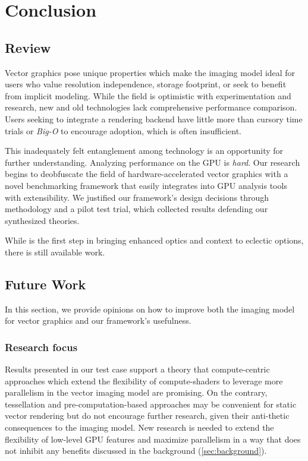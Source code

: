 \section{Conclusion}

\subsection{Review}\label{sec:conclusion}
Vector graphics pose unique properties which make the imaging model ideal for users who value resolution independence, storage footprint, or seek to benefit from implicit modeling. While the field is optimistic with experimentation and research, new and old technologies lack comprehensive performance comparison. Users seeking to integrate a rendering backend have little more than cursory time trials or \emph{Big-O} to encourage adoption, which is often insufficient.\medskip

This inadequately felt entanglement among technology is an opportunity for further understanding. Analyzing performance on the GPU is \emph{hard}. Our research begins to deobfuscate the field of hardware-accelerated vector graphics with a novel benchmarking framework that easily integrates into GPU analysis tools with extensibility. We justified our framework's design decisions through methodology and a pilot test trial, which collected results defending our synthesized theories.\medskip

While \toollinkedname is the first step in bringing enhanced optics and context to eclectic options, there is still available work.\medskip

\subsection{Future Work}\label{sec:future_work}

In this section, we provide opinions on how to improve both the imaging model for vector graphics and our framework's usefulness.

\subsubsection{Research focus}
Results presented in our test case support a theory that compute-centric approaches which extend the flexibility of compute-shaders to leverage more parallelism in the vector imaging model are promising. On the contrary, tessellation and pre-computation-based approaches may be convenient for static vector rendering but do not encourage further research, given their anti-thetic consequences to the imaging model. New research is needed to extend the flexibility of low-level GPU features and maximize parallelism in a way that does not inhibit any benefits discussed in the background (\cref{sec:background}).

